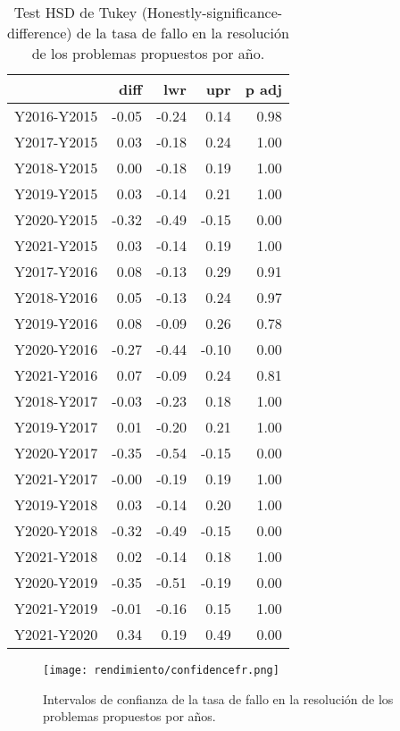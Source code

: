\begin{table}[H]
\centering
\caption{Test HSD de Tukey (Honestly-significance-difference) de la tasa de fallo en la resolución de los problemas propuestos por año.}
\label{tab:Tukeyfr}
\begin{tabular}{rrrrr}
  \hline
 & diff & lwr & upr & p adj \\ 
  \hline
Y2016-Y2015 & -0.05 & -0.24 & 0.14 & 0.98 \\ 
  Y2017-Y2015 & 0.03 & -0.18 & 0.24 & 1.00 \\ 
  Y2018-Y2015 & 0.00 & -0.18 & 0.19 & 1.00 \\ 
  Y2019-Y2015 & 0.03 & -0.14 & 0.21 & 1.00 \\ 
  Y2020-Y2015 & -0.32 & -0.49 & -0.15 & 0.00 \\ 
  Y2021-Y2015 & 0.03 & -0.14 & 0.19 & 1.00 \\ 
  Y2017-Y2016 & 0.08 & -0.13 & 0.29 & 0.91 \\ 
  Y2018-Y2016 & 0.05 & -0.13 & 0.24 & 0.97 \\ 
  Y2019-Y2016 & 0.08 & -0.09 & 0.26 & 0.78 \\ 
  Y2020-Y2016 & -0.27 & -0.44 & -0.10 & 0.00 \\ 
  Y2021-Y2016 & 0.07 & -0.09 & 0.24 & 0.81 \\ 
  Y2018-Y2017 & -0.03 & -0.23 & 0.18 & 1.00 \\ 
  Y2019-Y2017 & 0.01 & -0.20 & 0.21 & 1.00 \\ 
  Y2020-Y2017 & -0.35 & -0.54 & -0.15 & 0.00 \\ 
  Y2021-Y2017 & -0.00 & -0.19 & 0.19 & 1.00 \\ 
  Y2019-Y2018 & 0.03 & -0.14 & 0.20 & 1.00 \\ 
  Y2020-Y2018 & -0.32 & -0.49 & -0.15 & 0.00 \\ 
  Y2021-Y2018 & 0.02 & -0.14 & 0.18 & 1.00 \\ 
  Y2020-Y2019 & -0.35 & -0.51 & -0.19 & 0.00 \\ 
  Y2021-Y2019 & -0.01 & -0.16 & 0.15 & 1.00 \\ 
  Y2021-Y2020 & 0.34 & 0.19 & 0.49 & 0.00 \\ 
   \hline
\end{tabular}
\end{table}

\begin{figure}[H]
    \centering
    \texttt{[image: rendimiento/confidencefr.png]}
    \caption{Intervalos de confianza de la tasa de fallo en la resolución de los problemas propuestos por años.}
    \label{fig:confidencefr}
\end{figure}

